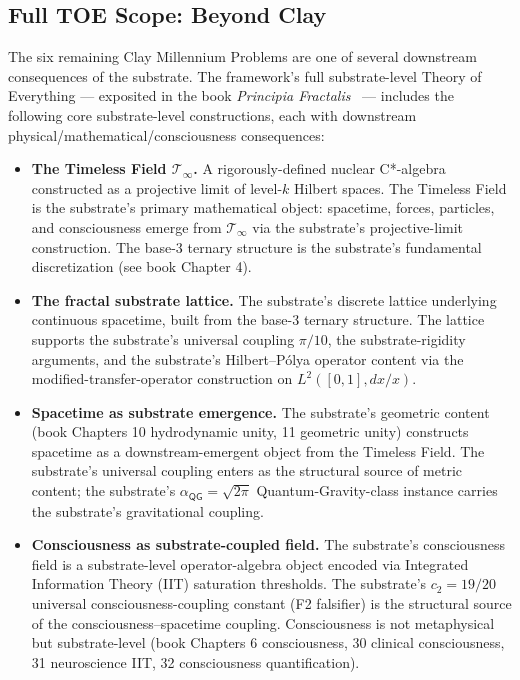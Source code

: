 \documentclass[11pt,a4paper]{amsart}
\theoremstyle{plain}
\theoremstyle{definition}
\begin{document}
\subsection{Full TOE Scope: Beyond Clay}\label{subsec:full-toe-scope}

The six remaining Clay Millennium Problems are one of several downstream consequences of the substrate. The framework's full substrate-level Theory of Everything --- exposited in the book \emph{Principia Fractalis}~\cite{cohen2026book} --- includes the following core substrate-level constructions, each with downstream physical/mathematical/consciousness consequences:

\begin{itemize}[itemsep=4pt,leftmargin=2em]
\item \textbf{The Timeless Field $\mathcal{T}_\infty$.} A rigorously-defined nuclear C*-algebra constructed as a projective limit of level-$k$ Hilbert spaces. The Timeless Field is the substrate's primary mathematical object: spacetime, forces, particles, and consciousness emerge from $\mathcal{T}_\infty$ via the substrate's projective-limit construction. The base-3 ternary structure is the substrate's fundamental discretization (see book Chapter 4).
\item \textbf{The fractal substrate lattice.} The substrate's discrete lattice underlying continuous spacetime, built from the base-3 ternary structure. The lattice supports the substrate's universal coupling $\pi/10$, the substrate-rigidity arguments, and the substrate's Hilbert--P\'olya operator content via the modified-transfer-operator construction on $L^2([0,1], dx/x)$.
\item \textbf{Spacetime as substrate emergence.} The substrate's geometric content (book Chapters 10 hydrodynamic unity, 11 geometric unity) constructs spacetime as a downstream-emergent object from the Timeless Field. The substrate's universal coupling enters as the structural source of metric content; the substrate's $\alpha_{\textsf{QG}} = \sqrt{2\pi}$ Quantum-Gravity-class instance carries the substrate's gravitational coupling.
\item \textbf{Consciousness as substrate-coupled field.} The substrate's consciousness field is a substrate-level operator-algebra object encoded via Integrated Information Theory (IIT) saturation thresholds. The substrate's $c_2 = 19/20$ universal consciousness-coupling constant (F2 falsifier) is the structural source of the consciousness--spacetime coupling. Consciousness is not metaphysical but substrate-level (book Chapters 6 consciousness, 30 clinical consciousness, 31 neuroscience IIT, 32 consciousness quantification).

\end{itemize}
\end{document}
